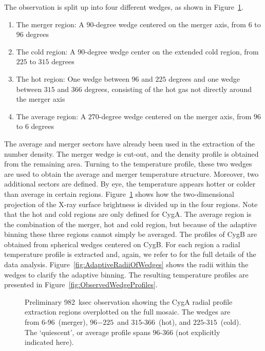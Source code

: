 \documentclass[MScProj_TLRH_ClusterEnergy.tex]{subfiles}
\begin{document}
The  observation is split up into four different wedges,
as shown in Figure~\ref{fig:wedges}.
\begin{enumerate}
    \item The merger region: A $90$-degree wedge centered on the merger axis, 
          from $6$ to $96$ degrees
    \item The cold region: A $90$-degree wedge center on the extended cold region,
          from $225$ to $315$ degrees
    \item The hot region: One wedge between $96$ and $225$ degrees and one wedge
          between $315$ and $366$ degrees, consisting of the hot gas not directly
          around the merger axis
    \item The average region: A $270$-degree wedge centered on the merger axis, 
          from $96$ to $6$ degrees
\end{enumerate}

The average and merger sectors have already been used in the extraction of the
number density. The merger wedge is cut-out, and the density profile is obtained
from the remaining area. Turning to the temperature profile, these two wedges 
are used to obtain the average and merger temperature structure. Moreover, 
two additional sectors are defined. By eye, the temperature appears hotter or
colder than average in certain regions. Figure~\ref{fig:wedges} shows how the 
two-dimensional projection of the X-ray surface brightness is divided up in 
the four regions. Note that the hot and cold regions are only defined for CygA. 
The average region is the combination of the merger, hot and cold region, but
because of the adaptive binning these three regions cannot simply be averaged.
The profiles of CygB are obtained from spherical wedges centered on CygB.
For each region a radial temperature profile is extracted and, again, we refer
to \citet[in prep]{2016MNRAS.123..456W} for the full details of the data analysis. 
Figure~\ref{fig:AdaptiveRadiiOfWedges} shows the radii within the wedges to
clarify the adaptive binning. The resulting temperature profiles are presented
in Figure~\ref{fig:ObservedWedgeProfiles}.



\begin{figure}
    \centering
    \caption{Preliminary 982~ksec  observation
             \citep[in prep]{2016MNRAS.123..456W} showing the CygA radial profile
             extraction regions overplotted on the full mosaic. The wedges are 
             from $6$\deg-$96$\deg \, (merger), $96$\deg$-225$\deg \, and
             $315$\deg-$366$\deg \, (hot), and $225$\deg-$315$\deg \, (cold).
             The `quiescent', or average profile spans $96$\deg-$366$\deg
             (not explicitly indicated here).}
    \label{fig:wedges}
\end{figure}
\end{document}
